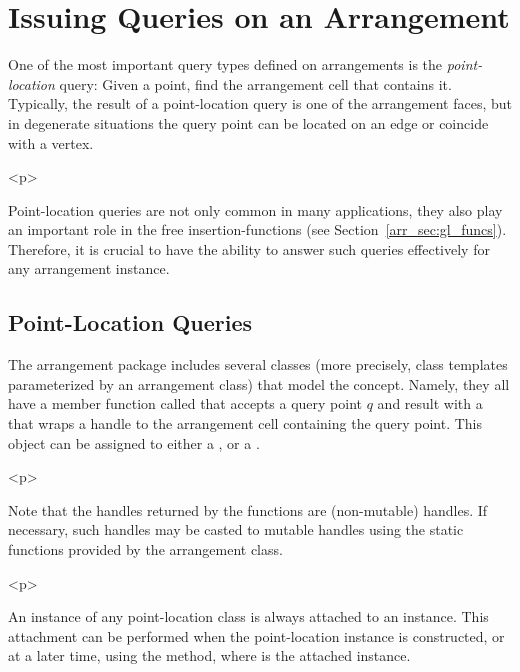 \section{Issuing Queries on an Arrangement}
\label{arr_sec:queries}
%
One of the most important query types defined on arrangements is
the {\em point-location} query: Given a point, find the
arrangement cell that contains it. Typically, the result of a
point-location query is one of the arrangement faces, but in
degenerate situations the query point can be located on an edge or
coincide with a vertex.

\begin{ccHtmlOnly}<p>\end{ccHtmlOnly}
Point-location queries are not only common in many applications,
they also play an important role in the free insertion-functions
(see Section~\ref{arr_sec:gl_funcs}). Therefore, it is crucial to
have the ability to answer such queries effectively for any
arrangement instance.

\subsection{Point-Location Queries}
\label{arr_ssec:pl}
%
The arrangement package includes several classes (more precisely,
class templates parameterized by an arrangement class) that model
the  concept. Namely, they all
have a member function called  that accepts a query
point $q$ and result with a \cgal\  that wraps a handle
to the arrangement cell containing the query point. This object can
be assigned to either a ,
 or a .

\begin{ccHtmlOnly}<p>\end{ccHtmlOnly}
Note that the handles returned by the  functions are
 (non-mutable) handles. If necessary, such handles may
be casted to mutable handles using the static functions
 provided by the
arrangement class.

\begin{ccHtmlOnly}<p>\end{ccHtmlOnly}
An instance of any point-location class is always attached to an
 instance. This attachment can be performed
when the point-location instance is constructed, or at a later
time, using the  method, where  is the
attached  instance.

